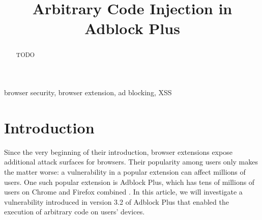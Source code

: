 \documentclass[conference]{IEEEtran}
\begin{document}
\title{Arbitrary Code Injection in Adblock Plus
}

\author{
\and
{}
\and
{}
}

\maketitle

\begin{abstract}
TODO
\end{abstract}

\begin{IEEEkeywords}
browser security, browser extension, ad blocking, XSS
\end{IEEEkeywords}

\section{Introduction}
Since the very beginning of their introduction, browser extensions expose additional attack surfaces for browsers. Their popularity among users only makes the matter worse: a vulnerability in a popular extension can affect millions of users. One such popular extension is Adblock Plus, which has tens of millions of users on Chrome and Firefox combined \cite{noauthor_adblockchrome_nodate, noauthor_adblockfirefox_nodate}. In this article, we will investigate a vulnerability introduced in version 3.2 of Adblock Plus that enabled the execution of arbitrary code on users' devices.
\end{document}
